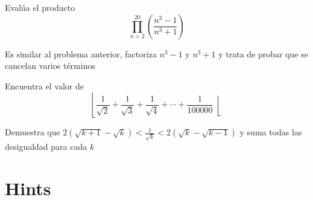 \documentclass[11pt]{scrartcl}
\begin{document}
    \begin{problem}
        Evalúa el producto
        \[\prod_{n=2}^{20} \left(\frac{n^3-1}{n^3+1}\right)\]
        \begin{hint}
            Es similar al problema anterior, factoriza $n^3-1$ y $n^3+1$ y trata de probar que se cancelan varios términos
        \end{hint}
    \end{problem}\hspace{0.2cm}
    
\begin{problem}
    Encuentra el valor de \[\left \lfloor \frac{1}{\sqrt{2}}+\frac{1}{\sqrt{3}}+\frac{1}{\sqrt{4}}+\cdots+\frac{1}{100000}\right \lfloor\]
    \begin{hint}
        Demuestra que $2(\sqrt{k+1}-\sqrt{k})<\frac{1}{\sqrt{k}}<2(\sqrt{k}-\sqrt{k-1})$ y suma todas las desigualdad para cada $k$
    \end{hint}
\end{problem}
\bigskip
\clearpage
\section{Hints}
\begin{enumerate}
  
\end{enumerate}
\end{document}
